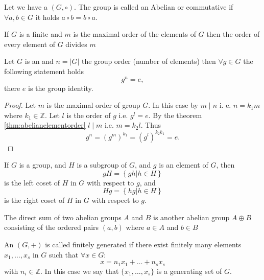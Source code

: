 \begin{appendices}
\begin{definition}
  Let we have a  $\left(G, \circ\right)$.
  The group is called an Abelian or commutative if
  $\forall a, b \in G$ it holds $a \circ b = b \circ a$.
  \label{def:abeliangroup}
\end{definition}

\begin{theorem}
  If $G$ is a finite  and $m$ is the maximal
  order of the elements of $G$ then the order of every element of $G$
  divides $m$ 
  \label{thm:abelianelementorder}
\end{theorem}

\begin{theorem}
  Let $G$ is an  and $n = \left|G\right|$
  the group order (number of elements) then $\forall g \in G$ the
  following statement holds
  \[
  g^n = e,
  \]
  there $e$ is the group identity.
  \begin{proof}
    Let $m$ is the maximal order of group $G$. In this case by
     $m \mid n$ i. e. $n = k_1 m$ where $k_1 \in
    \mathbb{Z}$. Let $l$ is the order of $g$ i.e. $g^l = e$. By the
    theorem \ref{thm:abelianelementorder} $l \mid m$ i.e. $m = k_2
    l$. Thus
    \[
    g^n = \left(g^m\right)^{k_1} = 
    \left(g^l\right)^{k_2 k_1} = e.
    \]
  \end{proof}
  \label{thm:abelianelement}
\end{theorem}

\begin{definition}[Coset]
  If $G$ is a group, and $H$ is a subgroup of $G$, and $g$ is an
  element of $G$, then
  \[
  gH = \left\{ gh \vert h \in H\right\}
  \]
  is the left coset of $H$ in $G$ with respect to $g$, and
  \[
  Hg = \left\{ hg \vert h \in H\right\}
  \]
  is the right coset of $H$ in $G$ with respect to $g$.
  \label{def:coset}
\end{definition}

\begin{definition}
  The direct sum of two abelian groups $A$ and
  $B$ is another abelian group $A \oplus B$ consisting of the ordered
  pairs
  $\left(a, b\right)$ where $a \in A$ and $b \in B$ \cite{wiki:directsum}
  \label{def:directsum}
\end{definition}

\begin{definition}
  An  $(G, +)$ is called finitely generated
  \cite{wiki:fgagroup} 
  if there exist finitely many elements $x_1, \dots, x_s$ in $G$ such that
  $\forall x \in G$:
  \begin{equation}
    x = n_1 x_1 + \dots + n_s x_s
    \label{eq:fgagroup}
  \end{equation}
  with $n_i \in \mathbb{Z}$. In this case we say that $\{x_1, \dots,
  x_s\}$ is a generating set of $G$.


\end{definition}
\end{appendices}
